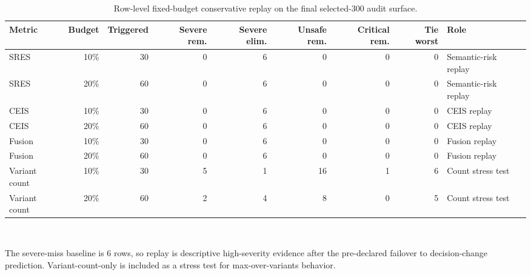 \begin{table}[!htbp]
\centering
\caption{Row-level fixed-budget conservative replay on the final selected-300 audit surface.}
\label{tab:recovery}
\footnotesize
\begin{tabularx}{\linewidth}{@{}L{1.10}R{0.65}R{0.70}R{0.70}R{0.70}R{0.70}R{0.70}R{0.80}L{1.10}@{}}
\toprule
Metric & Budget & Triggered & Severe rem. & Severe elim. & Unsafe rem. & Critical rem. & Tie worst & Role \\
\midrule
SRES & 10\% & 30 & 0 & 6 & 0 & 0 & 0 & Semantic-risk replay \\
SRES & 20\% & 60 & 0 & 6 & 0 & 0 & 0 & Semantic-risk replay \\
CEIS & 10\% & 30 & 0 & 6 & 0 & 0 & 0 & CEIS replay \\
CEIS & 20\% & 60 & 0 & 6 & 0 & 0 & 0 & CEIS replay \\
Fusion & 10\% & 30 & 0 & 6 & 0 & 0 & 0 & Fusion replay \\
Fusion & 20\% & 60 & 0 & 6 & 0 & 0 & 0 & Fusion replay \\
Variant count & 10\% & 30 & 5 & 1 & 16 & 1 & 6 & Count stress test \\
Variant count & 20\% & 60 & 2 & 4 & 8 & 0 & 5 & Count stress test \\
\bottomrule
\end{tabularx}
\\[0.4em]{\footnotesize\RaggedRight The severe-miss baseline is 6 rows, so replay is descriptive high-severity evidence after the pre-declared failover to decision-change prediction. Variant-count-only is included as a stress test for max-over-variants behavior.\par}
\end{table}
